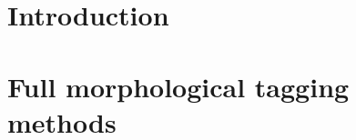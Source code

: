 \documentclass[a4paper,11pt,oneside,times,numbered,custommargin,custombib,PageStyleII]{Classes/PhDThesisPSnPDF}
\begin{document}
\frontmatter

\begin{titlepage}

\maketitle

\end{titlepage}

% 
% 

% 
% 
% 





\tableofcontents



\mainmatter

\chapter{Introduction}
% 


\chapter{Full morphological tagging methods}

\end{document}
